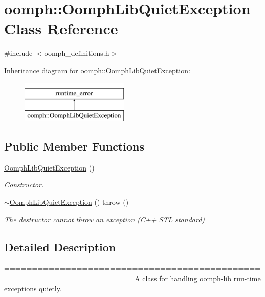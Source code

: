 \hypertarget{classoomph_1_1OomphLibQuietException}{}\section{oomph\+:\+:Oomph\+Lib\+Quiet\+Exception Class Reference}
\label{classoomph_1_1OomphLibQuietException}


{\ttfamily \#include $<$oomph\+\_\+definitions.\+h$>$}

Inheritance diagram for oomph\+:\+:Oomph\+Lib\+Quiet\+Exception\+:\begin{figure}[H]
\begin{center}
\leavevmode
\includegraphics[height=2.000000cm]{classoomph_1_1OomphLibQuietException}
\end{center}
\end{figure}
\subsection*{Public Member Functions}
\begin{DoxyCompactItemize}
\item 
\hyperlink{classoomph_1_1OomphLibQuietException_a2af6960f51a13bea9cf1eb65ab3c6c41}{Oomph\+Lib\+Quiet\+Exception} ()
\begin{DoxyCompactList}\small\item\em Constructor. \end{DoxyCompactList}\item 
\hyperlink{classoomph_1_1OomphLibQuietException_a23fe40685d9a4268929c037dc63af7b1}{$\sim$\+Oomph\+Lib\+Quiet\+Exception} ()  throw ()
\begin{DoxyCompactList}\small\item\em The destructor cannot throw an exception (C++ S\+TL standard) \end{DoxyCompactList}\end{DoxyCompactItemize}


\subsection{Detailed Description}
===================================================================== A class for handling oomph-\/lib run-\/time exceptions quietly. 

